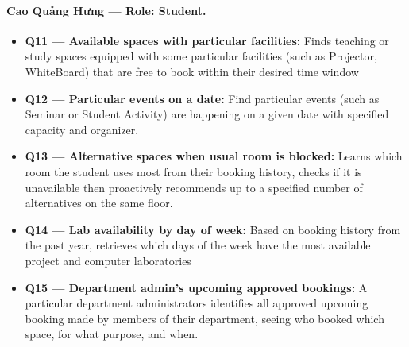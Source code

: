 \paragraph{Cao Quảng Hưng --- Role: Student.}
\begin{itemize}[noitemsep]
    \item \textbf{Q11 --- Available spaces with particular facilities:} Finds teaching or study spaces equipped with some particular facilities (such as Projector, WhiteBoard) that are free to book within their desired time window

    \item \textbf{Q12 --- Particular events on a date:} Find particular events (such as Seminar or Student Activity) are happening on a given date with specified capacity and organizer.

    \item \textbf{Q13 --- Alternative spaces when usual room is blocked: } Learns which room the student uses most from their booking history, checks if it is unavailable then proactively recommends up to a specified number of alternatives on the same floor. 

    \item \textbf{Q14 --- Lab availability by day of week:} Based on booking history from the past year, retrieves which days of the week have the most available project and computer laboratories

    \item \textbf{Q15 --- Department admin's upcoming approved bookings:} A particular department administrators identifies all approved upcoming booking made by members of their department, seeing who booked which space, for what purpose, and when.
\end{itemize}

